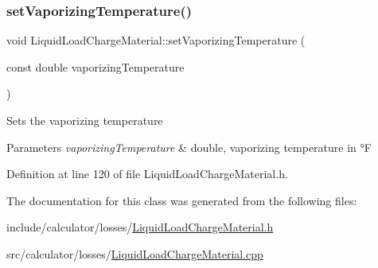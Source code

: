 \mbox{\label{class_liquid_load_charge_material_a50938e3270de5d3c59b872f290a761cc}} 
\subsubsection{\texorpdfstring{set\+Vaporizing\+Temperature()}{setVaporizingTemperature()}}
{\footnotesize\ttfamily void Liquid\+Load\+Charge\+Material\+::set\+Vaporizing\+Temperature (\begin{DoxyParamCaption}\item[{const double}]{vaporizing\+Temperature }\end{DoxyParamCaption})\hspace{0.3cm}{\ttfamily [inline]}}

Sets the vaporizing temperature 
\begin{DoxyParams}{Parameters}
{\em vaporizing\+Temperature} & double, vaporizing temperature in °F \\
\hline
\end{DoxyParams}


Definition at line 120 of file Liquid\+Load\+Charge\+Material.\+h.



The documentation for this class was generated from the following files\+:\begin{DoxyCompactItemize}
\item 
include/calculator/losses/\hyperlink{_liquid_load_charge_material_8h}{Liquid\+Load\+Charge\+Material.\+h}\item 
src/calculator/losses/\hyperlink{_liquid_load_charge_material_8cpp}{Liquid\+Load\+Charge\+Material.\+cpp}\end{DoxyCompactItemize}
